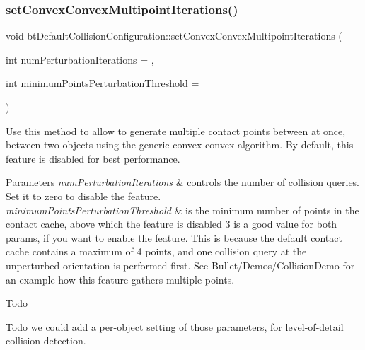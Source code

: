 \subsubsection{\texorpdfstring{set\+Convex\+Convex\+Multipoint\+Iterations()}{setConvexConvexMultipointIterations()}\hspace{0.1cm}{\footnotesize\ttfamily [1/2]}}
{\footnotesize\ttfamily void bt\+Default\+Collision\+Configuration\+::set\+Convex\+Convex\+Multipoint\+Iterations (\begin{DoxyParamCaption}\item[{int}]{num\+Perturbation\+Iterations = {},  }\item[{int}]{minimum\+Points\+Perturbation\+Threshold = {} }\end{DoxyParamCaption})}

Use this method to allow to generate multiple contact points between at once, between two objects using the generic convex-\/convex algorithm. By default, this feature is disabled for best performance. 
\begin{DoxyParams}{Parameters}
{\em num\+Perturbation\+Iterations} & controls the number of collision queries. Set it to zero to disable the feature. \\
\hline
{\em minimum\+Points\+Perturbation\+Threshold} & is the minimum number of points in the contact cache, above which the feature is disabled 3 is a good value for both params, if you want to enable the feature. This is because the default contact cache contains a maximum of 4 points, and one collision query at the unperturbed orientation is performed first. See Bullet/\+Demos/\+Collision\+Demo for an example how this feature gathers multiple points. \\
\hline
\end{DoxyParams}
\begin{DoxyRefDesc}{Todo}
\item[\hyperlink{todo__todo000049}{Todo}]we could add a per-\/object setting of those parameters, for level-\/of-\/detail collision detection. \end{DoxyRefDesc}
\mbox{\label{classbtDefaultCollisionConfiguration_a39a173eedf0e8d55dd89ef3b637925a9}} 
